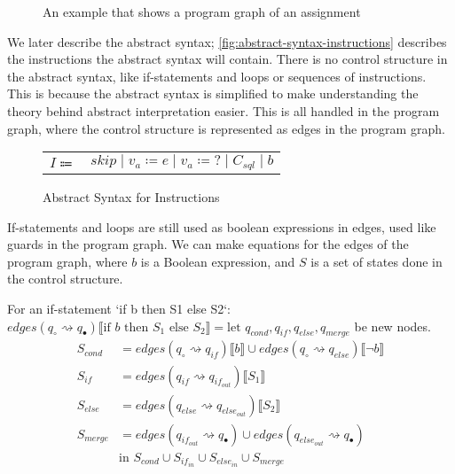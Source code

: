 \begin{figure}[htb!]
    \center
    
    \caption{An example that shows a program graph of an assignment}
    \label{fig:tikz-program-graph-assignment}
\end{figure}

We later describe the abstract syntax; \autoref{fig:abstract-syntax-instructions} describes the instructions the abstract syntax will contain.
There is no control structure in the abstract syntax, like if-statements and loops or sequences of instructions.
This is because the abstract syntax is simplified to make understanding the theory behind abstract interpretation easier.
This is all handled in the program graph, where the control structure is represented as edges in the program graph.

\begin{figure}
    \center
    \begin{tabular}{r l}
        $I \Coloneqq$ & $skip \mid v_a \coloneqq e \mid v_a \coloneqq ? \mid C_{sql} \mid b$
    \end{tabular}
    \caption{Abstract Syntax for Instructions}
    \label{fig:abstract-syntax-instructions}
\end{figure}

If-statements and loops are still used as boolean expressions in edges, used like guards in the program graph.
We can make equations for the edges of the program graph, where $b$ is a Boolean expression, and $S$ is a set of states done in the control structure.

For an if-statement `if b then S1 else S2`:
$edges(q_{\circ} \rightsquigarrow q_{\bullet})\llbracket \text{if } b \text{ then } S_1 \text{ else } S_2 \rrbracket = \text{let } q_{cond}, q_{if}, q_{else}, q_{merge}$ be new nodes.
\begin{align}
    S_{cond} &= edges(q_\circ \rightsquigarrow q_{if})\llbracket b \rrbracket \cup edges(q_\circ \rightsquigarrow q_{else})\llbracket \neg b \rrbracket \\
    S_{if} &= edges(q_{if} \rightsquigarrow q_{if_{out}})\llbracket S_1 \rrbracket \\
    S_{else} &= edges(q_{else} \rightsquigarrow q_{else_{out}})\llbracket S_2 \rrbracket \\
    S_{merge} &= edges(q_{if_{out}} \rightsquigarrow q_{\bullet}) \cup edges(q_{else_{out}} \rightsquigarrow q_{\bullet}) \\
    &\text{in } S_{cond} \cup S_{if_{in}} \cup S_{else_{in}} \cup S_{merge}
\end{align}

